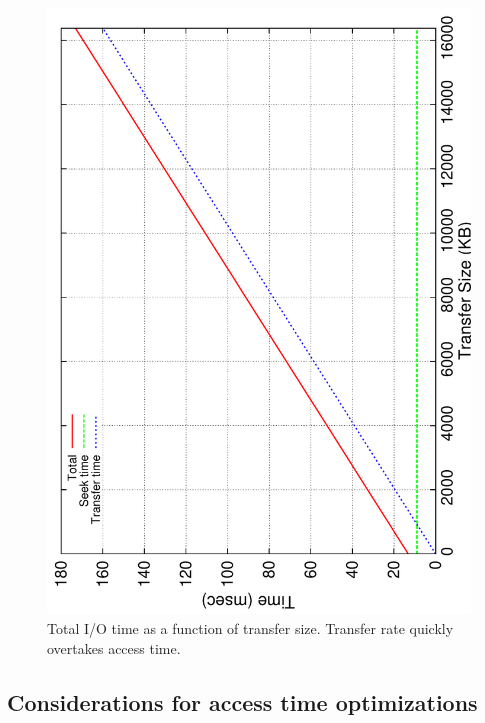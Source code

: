 \begin{figure}
  \includegraphics[angle=270,width=\linewidth]{images/io/io-overall}
  \caption{Total I/O time as a function of transfer size.  Transfer rate
  quickly overtakes access time.}
  \label{fig:io-total}
\end{figure}


\subsection{Considerations for access time optimizations}

